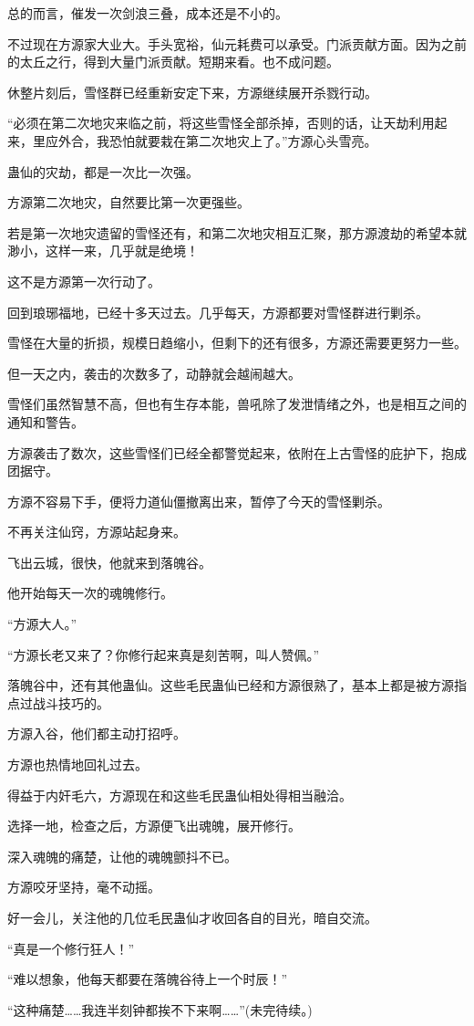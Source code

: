\begin{this_body}
总的而言，催发一次剑浪三叠，成本还是不小的。

不过现在方源家大业大。手头宽裕，仙元耗费可以承受。门派贡献方面。因为之前的太丘之行，得到大量门派贡献。短期来看。也不成问题。

休整片刻后，雪怪群已经重新安定下来，方源继续展开杀戮行动。

“必须在第二次地灾来临之前，将这些雪怪全部杀掉，否则的话，让天劫利用起来，里应外合，我恐怕就要栽在第二次地灾上了。”方源心头雪亮。

蛊仙的灾劫，都是一次比一次强。

方源第二次地灾，自然要比第一次更强些。

若是第一次地灾遗留的雪怪还有，和第二次地灾相互汇聚，那方源渡劫的希望本就渺小，这样一来，几乎就是绝境！

这不是方源第一次行动了。

回到琅琊福地，已经十多天过去。几乎每天，方源都要对雪怪群进行剿杀。

雪怪在大量的折损，规模日趋缩小，但剩下的还有很多，方源还需要更努力一些。

但一天之内，袭击的次数多了，动静就会越闹越大。

雪怪们虽然智慧不高，但也有生存本能，兽吼除了发泄情绪之外，也是相互之间的通知和警告。

方源袭击了数次，这些雪怪们已经全都警觉起来，依附在上古雪怪的庇护下，抱成团据守。

方源不容易下手，便将力道仙僵撤离出来，暂停了今天的雪怪剿杀。

不再关注仙窍，方源站起身来。

飞出云城，很快，他就来到落魄谷。

他开始每天一次的魂魄修行。

“方源大人。”

“方源长老又来了？你修行起来真是刻苦啊，叫人赞佩。”

落魄谷中，还有其他蛊仙。这些毛民蛊仙已经和方源很熟了，基本上都是被方源指点过战斗技巧的。

方源入谷，他们都主动打招呼。

方源也热情地回礼过去。

得益于内奸毛六，方源现在和这些毛民蛊仙相处得相当融洽。

选择一地，检查之后，方源便飞出魂魄，展开修行。

深入魂魄的痛楚，让他的魂魄颤抖不已。

方源咬牙坚持，毫不动摇。

好一会儿，关注他的几位毛民蛊仙才收回各自的目光，暗自交流。

“真是一个修行狂人！”

“难以想象，他每天都要在落魄谷待上一个时辰！”

“这种痛楚……我连半刻钟都挨不下来啊……”(未完待续。)

\end{this_body}

